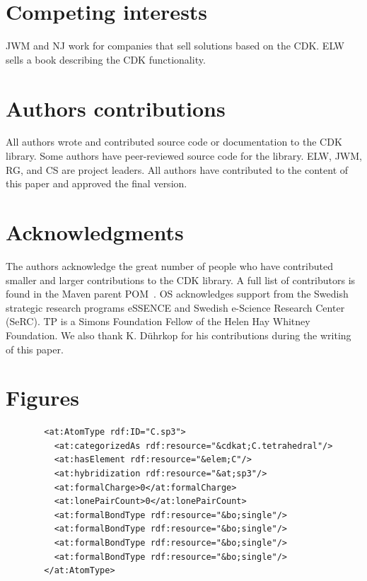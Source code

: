 \documentclass[doublespacing]{bmcart}
\begin{document}
\begin{backmatter}

\section*{Competing interests}
JWM and NJ work for companies that sell solutions based on the CDK. ELW sells
a book describing the CDK functionality.

\section*{Authors contributions}
All authors wrote and contributed source code or documentation to the CDK
library. Some authors have peer-reviewed source code for the library.
ELW, JWM, RG, and CS are project leaders. All authors have contributed to the
content of this paper and approved the final version.

\section*{Acknowledgments}
The authors acknowledge the great number of people who have contributed smaller
and larger contributions to the CDK library. A full list of contributors is
found in the Maven parent POM~\cite{AUTHORS}. OS acknowledges support from the Swedish strategic research programs eSSENCE and Swedish e-Science Research Center (SeRC). TP is a Simons Foundation Fellow of the Helen Hay Whitney Foundation.
We also thank K. Dührkop for his contributions during the writing of this paper.




\newpage

\section*{Figures}

\begin{figure}[h!]
\caption{}
\begin{verbatim}
  <at:AtomType rdf:ID="C.sp3">
    <at:categorizedAs rdf:resource="&cdkat;C.tetrahedral"/>
    <at:hasElement rdf:resource="&elem;C"/>
    <at:hybridization rdf:resource="&at;sp3"/>
    <at:formalCharge>0</at:formalCharge>
    <at:lonePairCount>0</at:lonePairCount>
    <at:formalBondType rdf:resource="&bo;single"/>
    <at:formalBondType rdf:resource="&bo;single"/>
    <at:formalBondType rdf:resource="&bo;single"/>
    <at:formalBondType rdf:resource="&bo;single"/>
  </at:AtomType>
\end{verbatim}
  \label{fig:atomtype}
\end{figure}



\end{backmatter}
\end{document}
